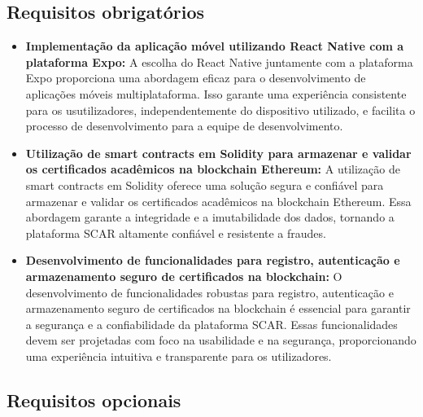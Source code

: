 \documentclass[10pt]{article}
\begin{document}
\subsection*{Requisitos obrigatórios}

\begin{itemize}

    \item\textbf{Implementação da aplicação móvel utilizando React Native com a plataforma Expo:} A escolha do React Native
          juntamente com a plataforma Expo proporciona uma abordagem eficaz para o desenvolvimento de aplicações móveis
          multiplataforma. Isso garante uma experiência consistente para os usutilizadores, independentemente do dispositivo
          utilizado, e facilita o processo de desenvolvimento para a equipe de desenvolvimento.

    \item\textbf{Utilização de smart contracts em Solidity para armazenar e validar os certificados acadêmicos na blockchain
              Ethereum:} A utilização de smart contracts em Solidity oferece uma solução segura e confiável para armazenar
          e validar os certificados acadêmicos na blockchain Ethereum. Essa abordagem garante a integridade e a
          imutabilidade dos dados, tornando a plataforma SCAR altamente confiável e resistente a fraudes.

    \item\textbf{Desenvolvimento de funcionalidades para registro, autenticação e armazenamento seguro de certificados na
              blockchain:} O desenvolvimento de funcionalidades robustas para registro, autenticação e armazenamento seguro
          de certificados na blockchain é essencial para garantir a segurança e a confiabilidade da plataforma SCAR.
          Essas funcionalidades devem ser projetadas com foco na usabilidade e na segurança, proporcionando uma
          experiência intuitiva e transparente para os utilizadores.

\end{itemize}

\subsection*{Requisitos opcionais}
\end{document}
